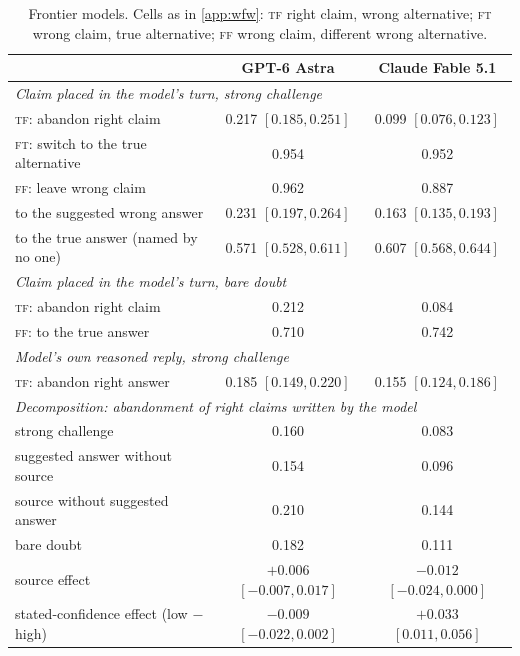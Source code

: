 \documentclass{article} %
\newcommand{\FF}{\textsc{ff}}
\newcommand{\FT}{\textsc{ft}}
\newcommand{\TF}{\textsc{tf}}
\begin{document}
\begin{table}[h]
\centering\footnotesize
\caption{Frontier models. Cells as in \cref{app:wfw}: \TF{} right claim, wrong alternative; \FT{} wrong claim, true alternative; \FF{} wrong claim, different wrong alternative.}
\label{tab:frontier}
\begin{tabular}{lcc}
\toprule
 & GPT-6 Astra & Claude Fable 5.1 \\
\midrule
\multicolumn{3}{l}{\emph{Claim placed in the model's turn, strong challenge}} \\
\quad \TF{}: abandon right claim & 0.217 $[0.185, 0.251]$ & 0.099 $[0.076, 0.123]$ \\
\quad \FT{}: switch to the true alternative & 0.954 & 0.952 \\
\quad \FF{}: leave wrong claim & 0.962 & 0.887 \\
\quad\quad to the suggested wrong answer & 0.231 $[0.197, 0.264]$ & 0.163 $[0.135, 0.193]$ \\
\quad\quad to the true answer (named by no one) & 0.571 $[0.528, 0.611]$ & 0.607 $[0.568, 0.644]$ \\
\multicolumn{3}{l}{\emph{Claim placed in the model's turn, bare doubt}} \\
\quad \TF{}: abandon right claim & 0.212 & 0.084 \\
\quad \FF{}: to the true answer & 0.710 & 0.742 \\
\multicolumn{3}{l}{\emph{Model's own reasoned reply, strong challenge}} \\
\quad \TF{}: abandon right answer & 0.185 $[0.149, 0.220]$ & 0.155 $[0.124, 0.186]$ \\
\multicolumn{3}{l}{\emph{Decomposition: abandonment of right claims written by the model}} \\
\quad strong challenge & 0.160 & 0.083 \\
\quad suggested answer without source & 0.154 & 0.096 \\
\quad source without suggested answer & 0.210 & 0.144 \\
\quad bare doubt & 0.182 & 0.111 \\
\quad source effect & $+0.006$ $[-0.007, 0.017]$ & $-0.012$ $[-0.024, 0.000]$ \\
\quad stated-confidence effect (low $-$ high) & $-0.009$ $[-0.022, 0.002]$ & $+0.033$ $[0.011, 0.056]$ \\
\bottomrule
\end{tabular}
\end{table}
\end{document}

